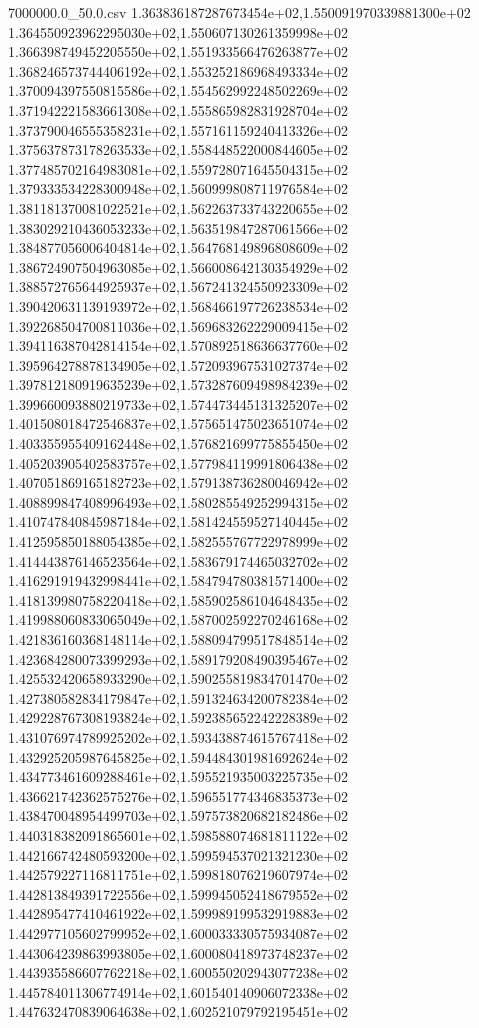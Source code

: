 \begin{filecontents*}{7000000.0_50.0.csv}
1.363836187287673454e+02,1.550091970339881300e+02
1.364550923962295030e+02,1.550607130261359998e+02
1.366398749452205550e+02,1.551933566476263877e+02
1.368246573744406192e+02,1.553252186968493334e+02
1.370094397550815586e+02,1.554562992248502269e+02
1.371942221583661308e+02,1.555865982831928704e+02
1.373790046555358231e+02,1.557161159240413326e+02
1.375637873178263533e+02,1.558448522000844605e+02
1.377485702164983081e+02,1.559728071645504315e+02
1.379333534228300948e+02,1.560999808711976584e+02
1.381181370081022521e+02,1.562263733743220655e+02
1.383029210436053233e+02,1.563519847287061566e+02
1.384877056006404814e+02,1.564768149896808609e+02
1.386724907504963085e+02,1.566008642130354929e+02
1.388572765644925937e+02,1.567241324550923309e+02
1.390420631139193972e+02,1.568466197726238534e+02
1.392268504700811036e+02,1.569683262229009415e+02
1.394116387042814154e+02,1.570892518636637760e+02
1.395964278878134905e+02,1.572093967531027374e+02
1.397812180919635239e+02,1.573287609498984239e+02
1.399660093880219733e+02,1.574473445131325207e+02
1.401508018472546837e+02,1.575651475023651074e+02
1.403355955409162448e+02,1.576821699775855450e+02
1.405203905402583757e+02,1.577984119991806438e+02
1.407051869165182723e+02,1.579138736280046942e+02
1.408899847408996493e+02,1.580285549252994315e+02
1.410747840845987184e+02,1.581424559527140445e+02
1.412595850188054385e+02,1.582555767722978999e+02
1.414443876146523564e+02,1.583679174465032702e+02
1.416291919432998441e+02,1.584794780381571400e+02
1.418139980758220418e+02,1.585902586104648435e+02
1.419988060833065049e+02,1.587002592270246168e+02
1.421836160368148114e+02,1.588094799517848514e+02
1.423684280073399293e+02,1.589179208490395467e+02
1.425532420658933290e+02,1.590255819834701470e+02
1.427380582834179847e+02,1.591324634200782384e+02
1.429228767308193824e+02,1.592385652242228389e+02
1.431076974789925202e+02,1.593438874615767418e+02
1.432925205987645825e+02,1.594484301981692624e+02
1.434773461609288461e+02,1.595521935003225735e+02
1.436621742362575276e+02,1.596551774346835373e+02
1.438470048954499703e+02,1.597573820682182486e+02
1.440318382091865601e+02,1.598588074681811122e+02
1.442166742480593200e+02,1.599594537021321230e+02
1.442579227116811751e+02,1.599818076219607974e+02
1.442813849391722556e+02,1.599945052418679552e+02
1.442895477410461922e+02,1.599989199532919883e+02
1.442977105602799952e+02,1.600033330575934087e+02
1.443064239863993805e+02,1.600080418973748237e+02
1.443935586607762218e+02,1.600550202943077238e+02
1.445784011306774914e+02,1.601540140906072338e+02
1.447632470839064638e+02,1.602521079792195451e+02

\end{filecontents*}
